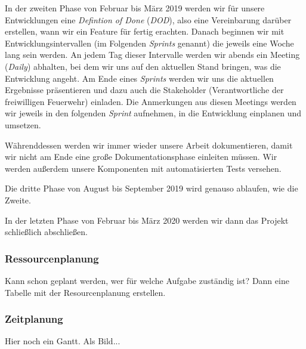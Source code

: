 In der zweiten Phase von Februar bis März 2019 werden wir für unsere Entwicklungen eine \textit{Defintion of Done} (\textit{DOD}), also eine Vereinbarung darüber erstellen, wann wir ein Feature für fertig erachten. Danach beginnen wir mit Entwicklungsintervallen (im Folgenden \textit{Sprints }genannt) die jeweils eine Woche lang sein werden. An jedem Tag dieser Intervalle werden wir abends ein Meeting (\textit{Daily}) abhalten, bei dem wir uns auf den aktuellen Stand bringen, was die Entwicklung angeht. Am Ende eines \textit{Sprints} werden wir uns die aktuellen Ergebnisse präsentieren und dazu auch die Stakeholder (Verantwortliche der freiwilligen Feuerwehr) einladen. Die Anmerkungen aus diesen Meetings werden wir jeweils in den folgenden \textit{Sprint} aufnehmen, in die Entwicklung einplanen und umsetzen. 

Währenddessen werden wir immer wieder unsere Arbeit dokumentieren, damit wir nicht am Ende eine große Dokumentationsphase einleiten müssen. Wir werden außerdem unsere Komponenten mit automatisierten Tests versehen.

Die dritte Phase von August bis September 2019 wird genauso ablaufen, wie die Zweite.

In der letzten Phase von Februar bis März 2020 werden wir dann das Projekt schließlich abschließen.  

\subsubsection{Ressourcenplanung}

Kann schon geplant werden, wer für welche Aufgabe zuständig ist? Dann eine Tabelle mit der Resourcenplanung erstellen.

\subsubsection{Zeitplanung}

Hier noch ein Gantt. Als Bild...
